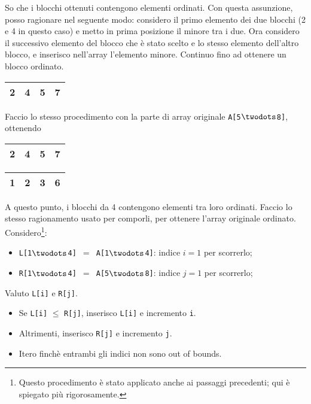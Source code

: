 So che i blocchi ottenuti contengono elementi ordinati. Con questa assunzione, posso ragionare 
nel seguente modo: considero il primo elemento dei due blocchi (2 e 4 in questo caso) e metto 
in prima posizione il minore tra i due. Ora considero il successivo elemento del blocco che è stato scelto e lo stesso elemento dell'altro blocco, e inserisco nell'array l'elemento minore. Continuo fino ad 
ottenere un blocco ordinato.

\begin{center}
	\begin{tabular}{|l|l|l|l|}
		\hline
		2 & 4 & 5 & 7 \\
		\hline
	\end{tabular}
\end{center}

Faccio lo stesso procedimento con la parte di array originale \texttt{A[5$\twodots$8]}, ottenendo

\begin{center}
	\begin{tabular}{|l|l|l|l|}
		\hline
		2 & 4 & 5 & 7 \\
		\hline
	\end{tabular}
	\hspace{1cm}
	\begin{tabular}{|l|l|l|l|}
		\hline
		1 & 2 & 3 & 6 \\
		\hline
	\end{tabular}
\end{center}

A questo punto, i blocchi da 4 contengono elementi tra loro ordinati. Faccio lo stesso ragionamento
usato per comporli, per ottenere l'array originale ordinato. Considero\footnote{Questo procedimento è stato applicato %
anche ai passaggi precedenti; qui è spiegato più rigorosamente.}:
\begin{itemize}[noitemsep]
    \item \texttt{L[1$\twodots$4] $=$ A[1$\twodots$4]}: indice $i = 1$ per scorrerlo;
    \item \texttt{R[1$\twodots$4] $=$ A[5$\twodots$8]}: indice $j = 1$ per scorrerlo;
\end{itemize}

Valuto \texttt{L[i]} e \texttt{R[j]}. \par
\begin{itemize}[noitemsep]
    \item Se \texttt{L[i]} $\leq$ \texttt{R[j]}, inserisco \texttt{L[i]} e incremento \texttt{i}. \par
    \item Altrimenti, inserisco \texttt{R[j]} e incremento \texttt{j}.
    \item Itero finchè entrambi gli indici non sono out of bounds.
\end{itemize}

